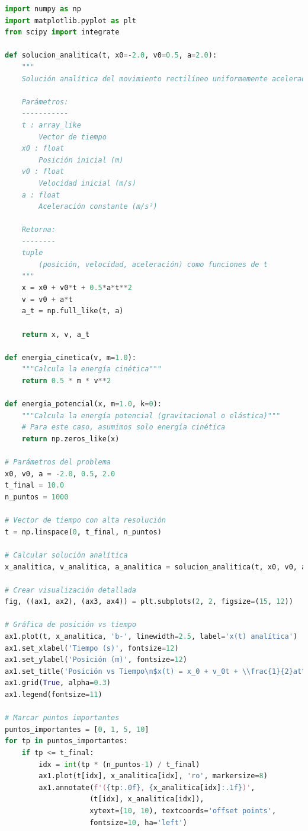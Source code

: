 \documentclass{article}
\begin{document}
	\begin{lstlisting}[language=Python, caption={Implementación de la solución analítica}]
import numpy as np
import matplotlib.pyplot as plt
from scipy import integrate

def solucion_analitica(t, x0=-2.0, v0=0.5, a=2.0):
    """
    Solución analítica del movimiento rectilíneo uniformemente acelerado
    
    Parámetros:
    -----------
    t : array_like
        Vector de tiempo
    x0 : float
        Posición inicial (m)
    v0 : float  
        Velocidad inicial (m/s)
    a : float
        Aceleración constante (m/s²)
        
    Retorna:
    --------
    tuple
        (posición, velocidad, aceleración) como funciones de t
    """
    x = x0 + v0*t + 0.5*a*t**2
    v = v0 + a*t
    a_t = np.full_like(t, a)
    
    return x, v, a_t

def energia_cinetica(v, m=1.0):
    """Calcula la energía cinética"""
    return 0.5 * m * v**2

def energia_potencial(x, m=1.0, k=0):
    """Calcula la energía potencial (gravitacional o elástica)"""
    # Para este caso, asumimos solo energía cinética
    return np.zeros_like(x)

# Parámetros del problema
x0, v0, a = -2.0, 0.5, 2.0
t_final = 10.0
n_puntos = 1000

# Vector de tiempo con alta resolución
t = np.linspace(0, t_final, n_puntos)

# Calcular solución analítica
x_analitica, v_analitica, a_analitica = solucion_analitica(t, x0, v0, a)

# Crear visualización detallada
fig, ((ax1, ax2), (ax3, ax4)) = plt.subplots(2, 2, figsize=(15, 12))

# Gráfica de posición vs tiempo
ax1.plot(t, x_analitica, 'b-', linewidth=2.5, label='x(t) analítica')
ax1.set_xlabel('Tiempo (s)', fontsize=12)
ax1.set_ylabel('Posición (m)', fontsize=12)
ax1.set_title('Posición vs Tiempo\n$x(t) = x_0 + v_0t + \\frac{1}{2}at^2$', fontsize=14)
ax1.grid(True, alpha=0.3)
ax1.legend(fontsize=11)

# Marcar puntos importantes
puntos_importantes = [0, 1, 5, 10]
for tp in puntos_importantes:
    if tp <= t_final:
        idx = int(tp * (n_puntos-1) / t_final)
        ax1.plot(t[idx], x_analitica[idx], 'ro', markersize=8)
        ax1.annotate(f'({tp:.0f}, {x_analitica[idx]:.1f})', 
                    (t[idx], x_analitica[idx]), 
                    xytext=(10, 10), textcoords='offset points',
                    fontsize=10, ha='left')


\end{lstlisting}
\end{document}
